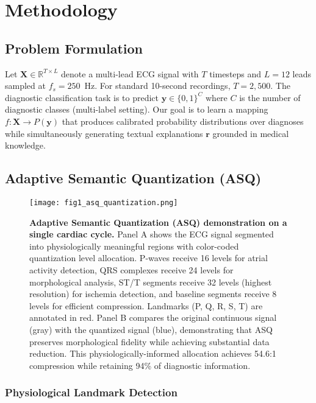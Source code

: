 \documentclass[journal]{IEEEtran}
\begin{document}
\section{Methodology}

\subsection{Problem Formulation}

Let $\mathbf{X} \in \mathbb{R}^{T \times L}$ denote a multi-lead ECG signal with $T$ timesteps and $L=12$ leads sampled at $f_s=250$~Hz. For standard 10-second recordings, $T = 2{,}500$. The diagnostic classification task is to predict $\mathbf{y} \in \{0,1\}^C$ where $C$ is the number of diagnostic classes (multi-label setting). Our goal is to learn a mapping $f: \mathbf{X} \rightarrow P(\mathbf{y})$ that produces calibrated probability distributions over diagnoses while simultaneously generating textual explanations $\mathbf{r}$ grounded in medical knowledge.

\subsection{Adaptive Semantic Quantization (ASQ)}

\begin{figure}[!t]
\centering
\texttt{[image: fig1\_asq\_quantization.png]}
\caption{\textbf{Adaptive Semantic Quantization (ASQ) demonstration on a single cardiac cycle.} Panel A shows the ECG signal segmented into physiologically meaningful regions with color-coded quantization level allocation. P-waves receive 16 levels for atrial activity detection, QRS complexes receive 24 levels for morphological analysis, ST/T segments receive 32 levels (highest resolution) for ischemia detection, and baseline segments receive 8 levels for efficient compression. Landmarks (P, Q, R, S, T) are annotated in red. Panel B compares the original continuous signal (gray) with the quantized signal (blue), demonstrating that ASQ preserves morphological fidelity while achieving substantial data reduction. This physiologically-informed allocation achieves 54.6:1 compression while retaining 94\% of diagnostic information.}
\label{fig:asq_quantization}
\end{figure}

\subsubsection{Physiological Landmark Detection}
\end{document}
